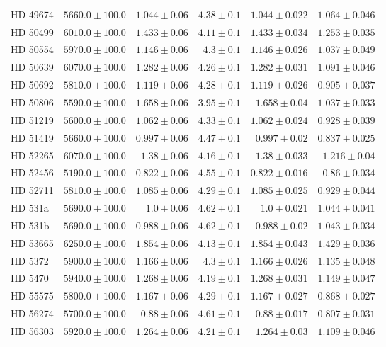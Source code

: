 \begin{longtable*}{lrrrrr}
HD 49674 & $5660.0\pm 100.0$ & $1.044\pm 0.06$ & $4.38\pm 0.1$ & $1.044\pm 0.022$ & $1.064\pm 0.046$ \\ 
HD 50499 & $6010.0\pm 100.0$ & $1.433\pm 0.06$ & $4.11\pm 0.1$ & $1.433\pm 0.034$ & $1.253\pm 0.035$ \\ 
HD 50554 & $5970.0\pm 100.0$ & $1.146\pm 0.06$ & $4.3\pm 0.1$ & $1.146\pm 0.026$ & $1.037\pm 0.049$ \\ 
HD 50639 & $6070.0\pm 100.0$ & $1.282\pm 0.06$ & $4.26\pm 0.1$ & $1.282\pm 0.031$ & $1.091\pm 0.046$ \\ 
HD 50692 & $5810.0\pm 100.0$ & $1.119\pm 0.06$ & $4.28\pm 0.1$ & $1.119\pm 0.026$ & $0.905\pm 0.037$ \\ 
HD 50806 & $5590.0\pm 100.0$ & $1.658\pm 0.06$ & $3.95\pm 0.1$ & $1.658\pm 0.04$ & $1.037\pm 0.033$ \\ 
HD 51219 & $5600.0\pm 100.0$ & $1.062\pm 0.06$ & $4.33\pm 0.1$ & $1.062\pm 0.024$ & $0.928\pm 0.039$ \\ 
HD 51419 & $5660.0\pm 100.0$ & $0.997\pm 0.06$ & $4.47\pm 0.1$ & $0.997\pm 0.02$ & $0.837\pm 0.025$ \\ 
HD 52265 & $6070.0\pm 100.0$ & $1.38\pm 0.06$ & $4.16\pm 0.1$ & $1.38\pm 0.033$ & $1.216\pm 0.04$ \\ 
HD 52456 & $5190.0\pm 100.0$ & $0.822\pm 0.06$ & $4.55\pm 0.1$ & $0.822\pm 0.016$ & $0.86\pm 0.034$ \\ 
HD 52711 & $5810.0\pm 100.0$ & $1.085\pm 0.06$ & $4.29\pm 0.1$ & $1.085\pm 0.025$ & $0.929\pm 0.044$ \\ 
HD 531a & $5690.0\pm 100.0$ & $1.0\pm 0.06$ & $4.62\pm 0.1$ & $1.0\pm 0.021$ & $1.044\pm 0.041$ \\ 
HD 531b & $5690.0\pm 100.0$ & $0.988\pm 0.06$ & $4.62\pm 0.1$ & $0.988\pm 0.02$ & $1.043\pm 0.034$ \\ 
HD 53665 & $6250.0\pm 100.0$ & $1.854\pm 0.06$ & $4.13\pm 0.1$ & $1.854\pm 0.043$ & $1.429\pm 0.036$ \\ 
HD 5372 & $5900.0\pm 100.0$ & $1.166\pm 0.06$ & $4.3\pm 0.1$ & $1.166\pm 0.026$ & $1.135\pm 0.048$ \\ 
HD 5470 & $5940.0\pm 100.0$ & $1.268\pm 0.06$ & $4.19\pm 0.1$ & $1.268\pm 0.031$ & $1.149\pm 0.047$ \\ 
HD 55575 & $5800.0\pm 100.0$ & $1.167\pm 0.06$ & $4.29\pm 0.1$ & $1.167\pm 0.027$ & $0.868\pm 0.027$ \\ 
HD 56274 & $5700.0\pm 100.0$ & $0.88\pm 0.06$ & $4.61\pm 0.1$ & $0.88\pm 0.017$ & $0.807\pm 0.031$ \\ 
HD 56303 & $5920.0\pm 100.0$ & $1.264\pm 0.06$ & $4.21\pm 0.1$ & $1.264\pm 0.03$ & $1.109\pm 0.046$ \\ 

\end{longtable*}
